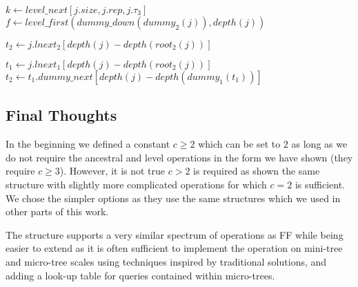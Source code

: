 \begin{algorithmic}
		\State {}
	\EndIf
	
	\State $k \gets level\_next[j.size, j.rep, j.\tau_3]$ 
	 
		\State $f \gets level\_first(dummy\_down(dummy_2(j)), depth(j))$
			\State {}
		\EndIf
		\State {} 
	\EndIf
	
	\State $t_2 \gets j.lnext_2[depth(j) - depth(root_2(j))]$ 
		\State {}
		\State {}
	\EndIf
	
	\State $t_1 \gets j.lnext_1[depth(j) - depth(root_2(j))]$ 
		\State $t_2 \gets t_1.dummy\_next[depth(j) - depth(dummy_1(t_1))]$
			\State {}
		\Else
			\State {}
		\EndIf
		\State {}
	\Else
		\State {}
	\EndIf
\EndFunction
\end{algorithmic}

\subsection{Final Thoughts}

In the beginning we defined a constant $c \ge 2$ which can be set to $2$ as long as we do not require the ancestral and level operations in the form we have shown (they require $c \ge 3$).
However, it is not true $c >2$ is required as  shown the same structure with slightly more complicated operations for which $c = 2$ is sufficient.
We chose the simpler options as they use the same structures which we used in other parts of this work.

The structure supports a very similar spectrum of operations as FF while being easier to extend as it is often sufficient to implement the operation on mini-tree and micro-tree scales using techniques inspired by traditional solutions, and adding a look-up table for queries contained within micro-trees.

